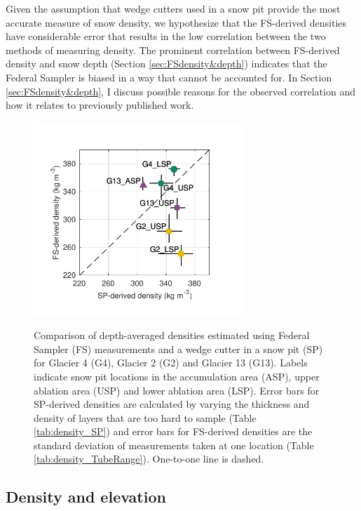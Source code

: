 \documentclass{sfuthesis}
\begin{document}
 Given the assumption that wedge cutters used in a snow pit provide the most accurate measure of snow density, we hypothesize that the FS-derived densities have considerable error that results in the low correlation between the two methods of measuring density. The prominent correlation between FS-derived density and snow depth (Section \ref{sec:FSdensity&depth}) indicates that the Federal Sampler is biased in a way that cannot be accounted for. In Section \ref{sec:FSdensity&depth}, I discuss possible reasons for the observed correlation and how it relates to previously published work. 

\begin{figure}[H]
	\centering
	\includegraphics[width =0.7\textwidth]{SPvsFS.pdf}\\
	\caption[Comparison of depth-averaged densities estimated using Federal Sampler (FS) measurements and a wedge cutter in a snow pit (SP) for study glaciers]{Comparison of depth-averaged densities estimated using Federal Sampler (FS) measurements and a wedge cutter in a snow pit (SP) for Glacier 4 (G4), Glacier 2 (G2) and Glacier 13 (G13). Labels indicate snow pit locations in the accumulation area (ASP), upper ablation area (USP) and lower ablation area (LSP). Error bars for SP-derived densities are calculated by varying the thickness and density of layers that are too hard to sample (Table \ref{tab:density_SP}) and error bars for FS-derived densities are the standard deviation of measurements taken at one location (Table \ref{tab:density_TubeRange}). One-to-one line is dashed.}
	\label{fig:density_pitVStube}
\end{figure}


\subsection{Density and elevation}
\end{document}
